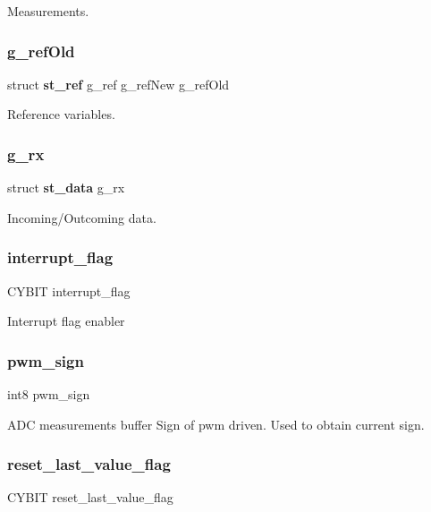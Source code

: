 Measurements. \mbox{\label{globals_8h_a158d26b6d15050b37d8039881d75e0dc}} 
\subsubsection{g\+\_\+ref\+Old}
{\footnotesize\ttfamily struct \textbf{ st\+\_\+ref} g\+\_\+ref g\+\_\+ref\+New g\+\_\+ref\+Old}

Reference variables. \mbox{\label{globals_8h_aa963ce8fafc11e104eb7ee22982d0345}} 
\subsubsection{g\+\_\+rx}
{\footnotesize\ttfamily struct \textbf{ st\+\_\+data} g\+\_\+rx}

Incoming/\+Outcoming data. \mbox{\label{globals_8h_a1e6fda88dfdabc63859f8907eb702920}} 
\subsubsection{interrupt\+\_\+flag}
{\footnotesize\ttfamily C\+Y\+B\+IT interrupt\+\_\+flag}

Interrupt flag enabler \mbox{\label{globals_8h_a8ac7ad7c894db750e93bc745818e26ca}} 
\subsubsection{pwm\+\_\+sign}
{\footnotesize\ttfamily int8 pwm\+\_\+sign}

A\+DC measurements buffer Sign of pwm driven. Used to obtain current sign. \mbox{\label{globals_8h_aa89a782cfe75ce7970236babd308fe69}} 
\subsubsection{reset\+\_\+last\+\_\+value\+\_\+flag}
{\footnotesize\ttfamily C\+Y\+B\+IT reset\+\_\+last\+\_\+value\+\_\+flag}

